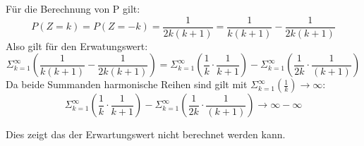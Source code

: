 Für die Berechnung von P gilt:
  \[ P(Z=k) = P(Z=-k) = \frac{1}{2k(k+1)} =  \frac{1}{k(k+1)} - \frac{1}{2k(k+1)} \] 
Also gilt für den Erwatungswert:
\[ \Sigma_{k=1}^{\infty}( \frac{1}{k(k+1)} - \frac{1}{2k(k+1)}) = \Sigma_{k=1}^{\infty}( \frac{1}{k} \cdot \frac{1}{k+1} ) - \Sigma_{k=1}^{\infty}(\frac{1}{2k} \cdot \frac{1}{(k+1) }) \]
Da beide Summanden harmonische Reihen sind gilt mit \( \Sigma_{k=1}^{\infty}(\frac{1}{k}) \to \infty \):
\[ \Sigma_{k=1}^{\infty}( \frac{1}{k} \cdot \frac{1}{k+1} ) - \Sigma_{k=1}^{\infty}(\frac{1}{2k} \cdot \frac{1}{(k+1) }) \to \infty - \infty\]

Dies zeigt das der Erwartungswert nicht berechnet werden kann.

